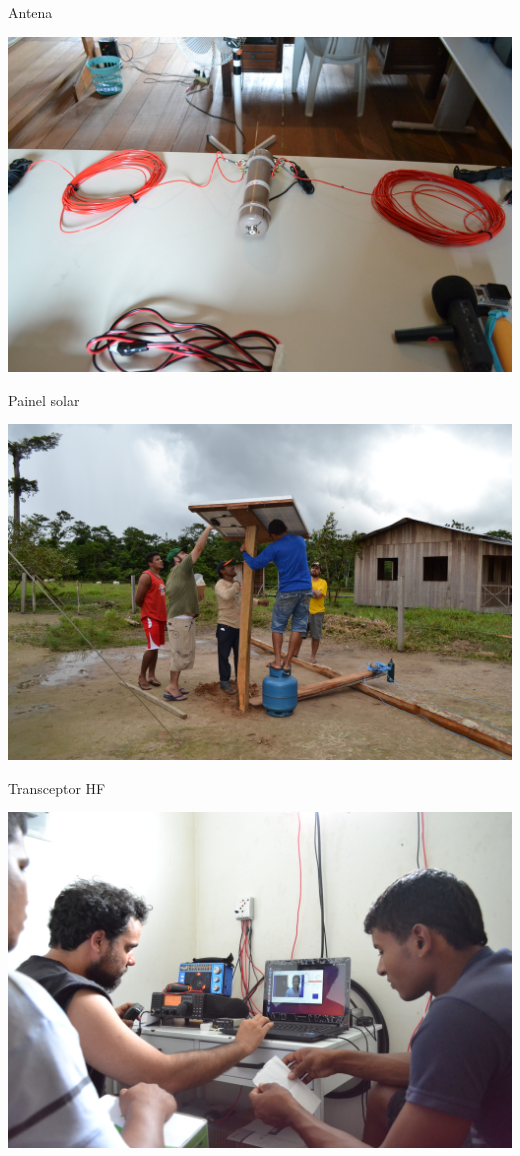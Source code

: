 



\begin{frame}
  \begin{block}{Antena}
    \begin{center}
      \includegraphics[width=.7\columnwidth]{antena.jpg}
    \end{center}
  \end{block}

\end{frame}

\begin{frame}
  \begin{block}{Painel solar}
    \begin{center}
      \includegraphics[width=.7\columnwidth]{solar.jpg}
    \end{center}
  \end{block}

\end{frame}

\begin{frame}
  \begin{block}{Transceptor HF}
    \begin{center}
      \includegraphics[width=.7\columnwidth]{config.jpg}
    \end{center}
  \end{block}
\end{frame}


